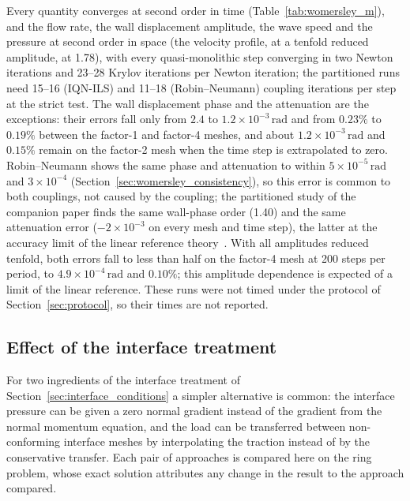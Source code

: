 Every quantity converges at second order in time (Table~\ref{tab:womersley_m}), and the flow rate, the wall displacement amplitude, the wave speed and the pressure at second order in space (the velocity profile, at a tenfold reduced amplitude, at 1.78), with every quasi-monolithic step converging in two Newton iterations and 23--28 Krylov iterations per Newton iteration; the partitioned runs need 15--16 (IQN-ILS) and 11--18 (Robin--Neumann) coupling iterations per step at the strict test.
The wall displacement phase and the attenuation are the exceptions: their errors fall only from $2.4$ to $1.2\times10^{-3}\,\mathrm{rad}$ and from $0.23\%$ to $0.19\%$ between the factor-1 and factor-4 meshes, and about $1.2\times10^{-3}\,\mathrm{rad}$ and $0.15\%$ remain on the factor-2 mesh when the time step is extrapolated to zero.
Robin--Neumann shows the same phase and attenuation to within $5\times10^{-5}\,\mathrm{rad}$ and $3\times10^{-4}$ (Section~\ref{sec:womersley_consistency}), so this error is common to both couplings, not caused by the coupling; the partitioned study of the companion paper finds the same wall-phase order (1.40) and the same attenuation error ($-2\times10^{-3}$ on every mesh and time step), the latter at the accuracy limit of the linear reference theory~\citep{CardiffFSIVerification2026}.
With all amplitudes reduced tenfold, both errors fall to less than half on the factor-4 mesh at 200 steps per period, to $4.9\times10^{-4}\,\mathrm{rad}$ and $0.10\%$; this amplitude dependence is expected of a limit of the linear reference.
These runs were not timed under the protocol of Section~\ref{sec:protocol}, so their times are not reported.

\subsection{Effect of the interface treatment}\label{sec:interface_comparison}

For two ingredients of the interface treatment of Section~\ref{sec:interface_conditions} a simpler alternative is common: the interface pressure can be given a zero normal gradient instead of the gradient from the normal momentum equation, and the load can be transferred between non-conforming interface meshes by interpolating the traction instead of by the conservative transfer.
Each pair of approaches is compared here on the ring problem, whose exact solution attributes any change in the result to the approach compared.

